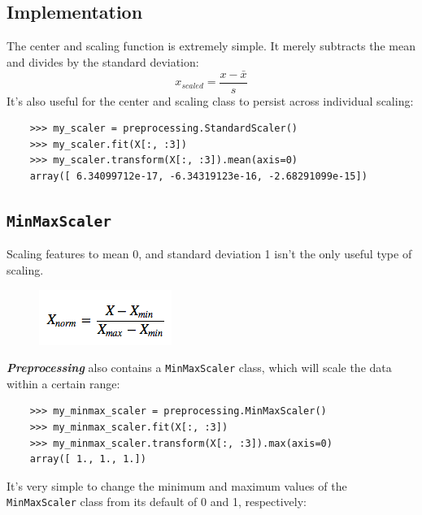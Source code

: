 \documentclass[SKL-MASTER.tex]{subfiles}
\begin{document}
\subsection*{Implementation} %
	The center and scaling function is extremely simple. It merely subtracts the mean and divides
	by the standard deviation:
\[ x_{scaled} = \frac{x-\bar{x}}{s} \]
	It's also useful for the center and scaling class to persist across individual scaling:
	\begin{framed}
		\begin{verbatim}
	>>> my_scaler = preprocessing.StandardScaler()
	>>> my_scaler.fit(X[:, :3])
	>>> my_scaler.transform(X[:, :3]).mean(axis=0)
	array([ 6.34099712e-17, -6.34319123e-16, -2.68291099e-15])
\end{verbatim}
\end{framed}
\newpage
\subsection*{\texttt{MinMaxScaler}}
	Scaling features to mean 0, and standard deviation 1 isn't the only useful type of scaling.
	
	\begin{figure}[h!]
\centering
\includegraphics[width=0.5\linewidth]{minmax}
\end{figure}

	\textbf{\textit{Preprocessing}} also contains a \texttt{MinMaxScaler} class, which will scale the data within a
	certain range:
	\begin{framed}
	\begin{verbatim}
	>>> my_minmax_scaler = preprocessing.MinMaxScaler()
	>>> my_minmax_scaler.fit(X[:, :3])
	>>> my_minmax_scaler.transform(X[:, :3]).max(axis=0)
	array([ 1., 1., 1.])
	\end{verbatim}
\end{framed}
	It's very simple to change the minimum and maximum values of the \texttt{MinMaxScaler} class
	from its default of 0 and 1, respectively:
	
\end{document}
